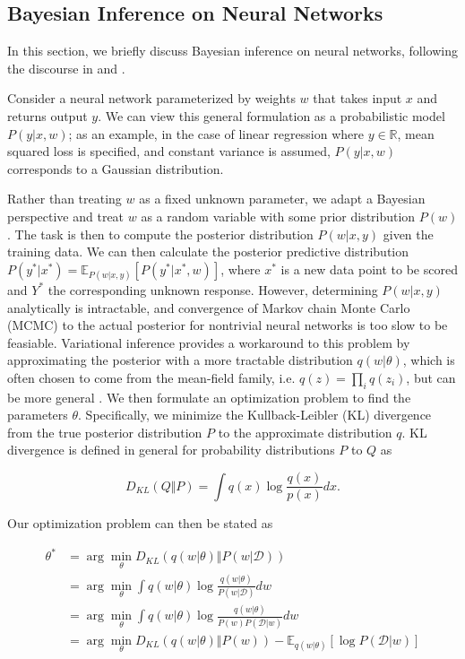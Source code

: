 \documentclass{article}
\begin{document}
\subsection{Bayesian Inference on Neural Networks} \label{section:bnn}

In this section, we briefly discuss Bayesian inference on neural networks, 
following the discourse in \cite{gravesPracticalVariational2011} and 
\cite{blundellWeightUncertainty2015}.

Consider a neural network parameterized by weights $w$ that takes input $x$ and
returns output $y$. We can view this general formulation as a probabilistic 
model $P(y|x, w)$; as an example, in the case of linear regression where $y \in
\mathbb{R}$, mean squared loss is specified, and constant variance is assumed, 
$P(y|x, w)$ corresponds to a Gaussian distribution.

Rather than treating $w$ as a fixed unknown parameter, we adapt a Bayesian
perspective and treat $w$ as a random variable with some prior distribution 
$P(w)$. The task is then to compute the posterior distribution $P(w|x, y)$ given
the training data. We can then calculate the posterior predictive distribution
$P(y^*|x^*) = \mathbb{E}_{P(w|x, y)}[P(y^*|x^*, w)]$, where $x^*$ is a new data
point to be scored and $Y^*$ the corresponding unknown response. However, 
determining $P(w|x, y)$ analytically is intractable, and convergence of Markov
chain Monte Carlo (MCMC) to the actual posterior for nontrivial neural networks 
is too slow to be feasiable.
Variational inference provides a workaround to this problem by approximating the
posterior with a more tractable distribution $q(w|\theta)$, which is often 
chosen to come from the mean-field family, i.e. $q(z) = \prod_i q(z_i)$, but can
be more general \cite{blundellWeightUncertainty2015}. We then formulate an 
optimization problem to find the parameters $\theta$. Specifically, we minimize
the Kullback-Leibler (KL) divergence from the true posterior distribution $P$ to
the approximate distribution $q$. KL divergence is defined in general for 
probability distributions $P$ to $Q$ as

\begin{equation}
    D_{KL}(Q \Vert P) = \int q(x) \log \frac{q(x)}{p(x)} dx.
\end{equation}

Our optimization problem can then be stated as

\begin{align}
    \theta^* &= \arg \min_\theta D_{KL}(q(w|\theta) \Vert P(w|\mathcal{D}))\\
             &= \arg \min_\theta \int q(w|\theta) \log \frac{q(w|\theta)}{P(w|\mathcal{D})} dw\\
             &= \arg \min_\theta \int q(w|\theta) \log \frac{q(w|\theta)}{P(w)P(\mathcal{D}|w)} dw \label{eq:2}\\
             &= \arg \min_\theta D_{KL}(q(w|\theta) \Vert P(w)) - \mathbb{E}_{q(w|\theta)}[\log P(\mathcal{D}|w)] \label{eq:1}
\end{align}
\end{document}
